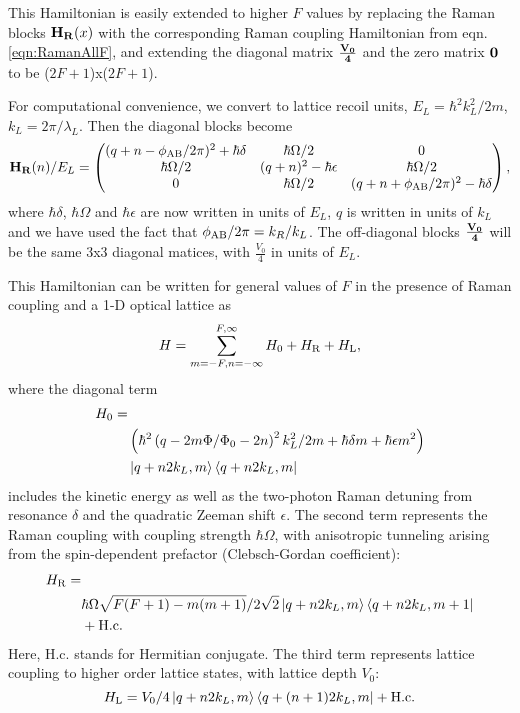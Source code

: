 This Hamiltonian is easily extended to higher $F$ values by replacing the Raman blocks ${\bf H_R}(x)$ with the corresponding Raman coupling Hamiltonian from eqn. \ref{eqn:RamanAllF}, and extending the diagonal matrix  ${\bf \frac{V_0}{4}}$ and the zero matrix $\bf 0$ to be ($2F+1$)x($2F+1$).

For computational convenience, we convert to lattice recoil units, $E_L=\hbar^2 k_L^2/2m$, $k_L=2\pi/\lambda_L$. Then the diagonal blocks become
 \begin{equation}
{\bf H_R}(n)/E_L = 
 \begin{pmatrix} (q + n -\phi_{\rm AB}/2\pi)^2+\hbar\delta & \hbar\Omega/2  &  0  \\ 
\hbar\Omega/2 & (q+n)^2 - \hbar\epsilon &  \hbar\Omega/2\\
 0 & \hbar\Omega/2 & (q + n +\phi_{\rm AB}/2\pi)^2 -\hbar\delta  \\
 \end{pmatrix} \\,
\end{equation}
where $\hbar\delta$, $\hbar\Omega$ and $\hbar\epsilon$ are now written in units of $E_L$, $q$ is written in units of $k_L$ and we have used the fact that $\phi_{\rm AB}/2\pi = k_R/k_L$. The off-diagonal blocks ${\bf \frac{V_0}{4}}$ will be the same 3x3 diagonal matices, with $\frac{V_0}{4}$ in units of $E_L$. 

This Hamiltonian can be written for general values of $F$ in the presence of Raman coupling and a 1-D optical lattice as
\begin{equation*}
H = \sum _{m=-F,n=-\infty}^{F,\infty}H_{0}+H_{\rm{R}}+H_{\rm{L}},
\label{eqn:SynDimHamiltonian}
\end{equation*}
where the diagonal term
\begin{eqnarray*}
H_{0} =&\\
&\left(\hbar^2\left(q-2m\Phi/\Phi_0-2n\right)^2 k_L^2/2m+\hbar\delta m+\hbar\epsilon m^2 \right)\\
&\mathinner{|{q+n2k_L,m}\rangle}\mathinner{\langle{q+n2k_L,m}|}
\end{eqnarray*}
includes the kinetic energy as well as the two-photon Raman detuning from resonance $\delta$ and the quadratic Zeeman shift $\epsilon$. The second term represents the Raman coupling  with coupling strength $\hbar\Omega$, with anisotropic tunneling arising from the spin-dependent prefactor (Clebsch-Gordan coefficient):
\begin{eqnarray*}
H_{\rm{R}} =&\\
&\hbar\Omega\sqrt{F(F+1)-m(m+1)}/2\sqrt{2}\mathinner{|{q+n2k_L,m}\rangle}\mathinner{\langle{q+n2k_L,m+1}|}\\
&+\rm{H.c.}
\end{eqnarray*}
Here,  H.c. stands for Hermitian conjugate. The third term represents lattice coupling to higher order lattice states, with lattice depth $V_0$: 
\begin{equation*}
H_{\rm{L}} = V_0/4\mathinner{|{q+n2k_L,m}\rangle}\mathinner{\langle{q+(n+1)2k_L,m}|} +\rm{H.c.}
\end{equation*}

